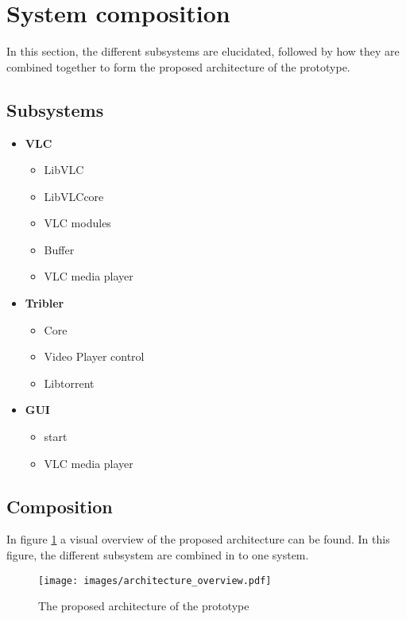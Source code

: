 \section{System composition}
In this section, the different subsystems are elucidated, followed by how they are combined together to form the proposed architecture of the prototype.
\subsection{Subsystems}
\begin{itemize}
\item \textbf{VLC}
	\begin{itemize}
		\item LibVLC
		\item LibVLCcore
		\item VLC modules
		\item Buffer
		\item VLC media player
	\end{itemize}
\item \textbf{Tribler}
	\begin{itemize}
		\item Core
		\item Video Player control
		\item Libtorrent
	\end{itemize}
\item \textbf{GUI}
	\begin{itemize}
		\item start 
		\item VLC media player
	\end{itemize}
\end{itemize}
\subsection{Composition}
In figure \ref{fig:prop_arch} a visual overview of the proposed architecture can be found. In this figure, the different subsystem are combined in to one system.
\pagebreak
\pagebreak
\begin{figure}[h]
	\texttt{[image: images/architecture\_overview.pdf]}
	\caption{The proposed architecture of the prototype}
	\label{fig:prop_arch}
\end{figure}
\pagebreak